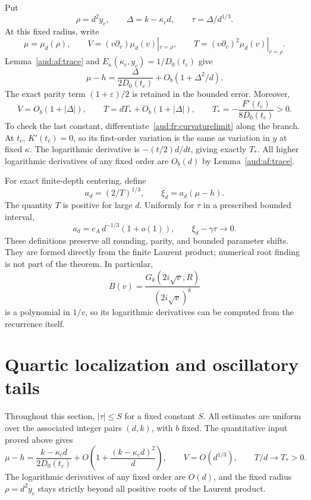 \documentclass[11pt,a4paper]{article}
\numberwithin{equation}{section}
\begin{document}
Put
\begin{equation}\label{aud:af:rho}
 \rho=d^2y_c,\qquad \Delta=k-\kappa_cd,\qquad
 \tau=\Delta/d^{1/3}.
\end{equation}
At this fixed radius, write
\[
 \mu=\mu_d(\rho),\qquad
 V=(v\partial_v)\mu_d(v)|_{v=\rho},\qquad
 T=(v\partial_v)^2\mu_d(v)|_{v=\rho}.
\]
Lemma~\ref{aud:af:trace} and $E_\kappa(\kappa_c,y_c)=1/D_0(t_c)$ give
\begin{equation}\label{aud:af:center}
 \mu-h=\frac{\Delta}{2D_0(t_c)}+O_b(1+\Delta^2/d).
\end{equation}
The exact parity term $(1+\varepsilon)/2$ is retained in the bounded error. Moreover,
\begin{equation}\label{aud:af:cumulants}
 V=O_b(1+|\Delta|),\qquad
 T=dT_*+O_b(1+|\Delta|),
 \qquad T_*=-\frac{F'(t_c)}{8D_0(t_c)}>0.
\end{equation}
To check the last constant, differentiate~\eqref{aud:fr:curvaturelimit} along the branch. At $t_c$, $K'(t_c)=0$, so its first-order variation is the same as variation in $y$ at fixed $\kappa$. The logarithmic derivative is $-(t/2)d/dt$, giving exactly $T_*$. All higher logarithmic derivatives of any fixed order are $O_b(d)$ by Lemma~\ref{aud:af:trace}.

For exact finite-depth centering, define
\begin{equation}\label{aud:af:discrete}
 a_d=(2/T)^{1/3},\qquad \xi_d=a_d(\mu-h).
\end{equation}
The quantity $T$ is positive for large $d$. Uniformly for $\tau$ in a prescribed bounded interval,
\begin{equation}\label{aud:af:scaled}
 a_d=c_A\,d^{-1/3}(1+o(1)),\qquad
 \xi_d-\gamma\tau\longrightarrow0.
\end{equation}
These definitions preserve all rounding, parity, and bounded parameter shifts. They are formed directly from the finite Laurent product; numerical root finding is not part of the theorem. In particular,
\[
 B(v)=\frac{G_k(2i\sqrt v,R)}{(2i\sqrt v)^k}
\]
is a polynomial in $1/v$, so its logarithmic derivatives can be computed from the recurrence itself.

\section{Quartic localization and oscillatory tails}
Throughout this section, $|\tau|\le S$ for a fixed constant $S$. All estimates are uniform over the associated integer pairs $(d,k)$, with $b$ fixed. The quantitative input proved above gives
\begin{equation}\label{aud:af:inputs}
 \mu-h=\frac{k-\kappa_c d}{2D_0(t_c)}+O\left(1+\frac{(k-\kappa_c d)^2}{d}\right),
 \qquad V=O(d^{1/3}),\qquad T/d\longrightarrow T_*>0.
\end{equation}
The logarithmic derivatives of any fixed order are $O(d)$, and the fixed radius $\rho=d^2y_c$ stays strictly beyond all positive roots of the Laurent product.
\end{document}
